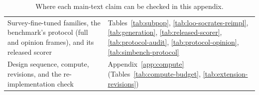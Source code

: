 \begin{table}[t]
\begin{tabular}{@{}p{5.2cm}p{10.3cm}@{}}
Survey-fine-tuned families, the benchmark's protocol (full and opinion frames), and its released scorer & Tables~\ref{tab:subpop}, \ref{tab:loo-socrates-reimpl}, \ref{tab:generation}, \ref{tab:released-scorer}, \ref{tab:protocol-audit}, \ref{tab:protocol-opinion}, \ref{tab:simbench-protocol} \\
Design sequence, compute, revisions, and the re-implementation check & Appendix~\ref{app:compute} (Tables~\ref{tab:compute-budget}, \ref{tab:extension-revisions}) \\
\bottomrule
\end{tabular}
\caption{Where each main-text claim can be checked in this appendix.}
\label{tab:appendix-index}
\end{table}
